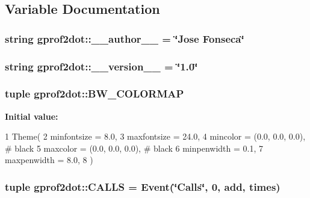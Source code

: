 \subsection{Variable Documentation}
\hypertarget{namespacegprof2dot_aef49cc0d071a48c27f269b1fefa0b259}{
\subsubsection[{\_\-\_\-author\_\-\_\-}]{\setlength{\rightskip}{0pt plus 5cm}string {\bf gprof2dot::\_\-\_\-author\_\-\_\-} = \char`\"{}Jose Fonseca\char`\"{}}}
\label{namespacegprof2dot_aef49cc0d071a48c27f269b1fefa0b259}
\hypertarget{namespacegprof2dot_abb4ac492c5f33eb464efcdd38c8a4af0}{
\subsubsection[{\_\-\_\-version\_\-\_\-}]{\setlength{\rightskip}{0pt plus 5cm}string {\bf gprof2dot::\_\-\_\-version\_\-\_\-} = \char`\"{}1.0\char`\"{}}}
\label{namespacegprof2dot_abb4ac492c5f33eb464efcdd38c8a4af0}
\hypertarget{namespacegprof2dot_a7f79294d4643a0627ba9548bcce0da5b}{
\subsubsection[{BW\_\-COLORMAP}]{\setlength{\rightskip}{0pt plus 5cm}tuple {\bf gprof2dot::BW\_\-COLORMAP}}}
\label{namespacegprof2dot_a7f79294d4643a0627ba9548bcce0da5b}
{\bfseries Initial value:}
\begin{DoxyCode}
1 Theme(
2     minfontsize = 8.0,
3     maxfontsize = 24.0,
4     mincolor = (0.0, 0.0, 0.0), # black
5     maxcolor = (0.0, 0.0, 0.0), # black
6     minpenwidth = 0.1,
7     maxpenwidth = 8.0,
8 )
\end{DoxyCode}
\hypertarget{namespacegprof2dot_a3cfb98044f99cfdfb0cef686b3ed3c74}{
\subsubsection[{CALLS}]{\setlength{\rightskip}{0pt plus 5cm}tuple {\bf gprof2dot::CALLS} = {\bf Event}(\char`\"{}Calls\char`\"{}, 0, add, times)}}
